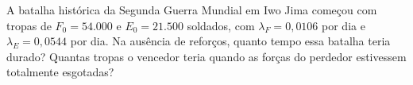A batalha histórica da Segunda Guerra Mundial em Iwo Jima começou com tropas de $F_0 = 54.000$ e $E_0 = 21.500$ soldados, com $\lambda_F = 0,0106$ por dia e $\lambda_E = 0,0544$ por dia. Na ausência de reforços, quanto tempo essa batalha teria durado? Quantas tropas o vencedor teria quando as forças do perdedor estivessem totalmente esgotadas?

